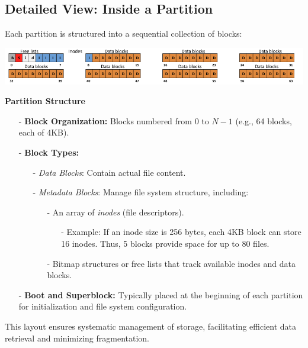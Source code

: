 \subsection{Detailed View: Inside a Partition}
Each partition is structured into a sequential collection of blocks:
\begin{center}
     \includegraphics[width=1\textwidth]{chapters/L6/images/storage-block.png}
\end{center}

\textbf{Partition Structure}\\
\begin{itemize}[itemsep=2pt, topsep=1pt]
      \item[-] \textbf{Block Organization:} Blocks numbered from $0$ to $N-1$ (e.g., 64 blocks, each of 4KB).
      \item[-] \textbf{Block Types:}
      \begin{itemize}
          \item[-] \textit{Data Blocks}: Contain actual file content.
          \item[-] \textit{Metadata Blocks}: Manage file system structure, including:
          \begin{itemize}
              \item[-] An array of \textit{inodes} (file descriptors).
              \begin{itemize}
                  \item[-] Example: If an inode size is 256 bytes, each 4KB block can store 16 inodes. Thus, 5 blocks provide space for up to 80 files.
              \end{itemize}
              \item[-] Bitmap structures or free lists that track available inodes and data blocks.
          \end{itemize}
      \end{itemize}
      \item[-] \textbf{Boot and Superblock:} Typically placed at the beginning of each partition for initialization and file system configuration.
  \end{itemize}


This layout ensures systematic management of storage, facilitating efficient data retrieval and minimizing fragmentation.

